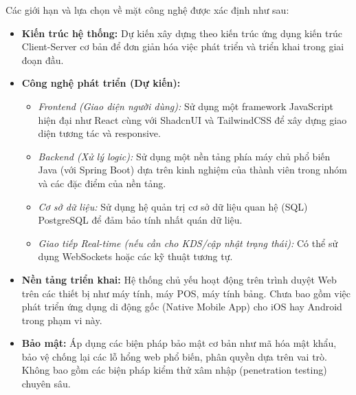 Các giới hạn và lựa chọn về mặt công nghệ được xác định như sau:

\begin{itemize}
    \item \textbf{Kiến trúc hệ thống:} Dự kiến xây dựng theo kiến trúc ứng dụng kiến trúc Client-Server cơ bản để đơn giản hóa việc phát triển và triển khai trong giai đoạn đầu.
    \item \textbf{Công nghệ phát triển (Dự kiến):}
        \begin{itemize}
            \item \textit{Frontend (Giao diện người dùng):} Sử dụng một framework JavaScript hiện đại như React cùng với ShadcnUI và TailwindCSS để xây dựng giao diện tương tác và responsive.
            \item \textit{Backend (Xử lý logic):} Sử dụng một nền tảng phía máy chủ phổ biến Java (với Spring Boot) dựa trên kinh nghiệm của thành viên trong nhóm và các đặc điểm của nền tảng.
            \item \textit{Cơ sở dữ liệu:} Sử dụng hệ quản trị cơ sở dữ liệu quan hệ (SQL) PostgreSQL để đảm bảo tính nhất quán dữ liệu.
            \item \textit{Giao tiếp Real-time (nếu cần cho KDS/cập nhật trạng thái):} Có thể sử dụng WebSockets hoặc các kỹ thuật tương tự.
        \end{itemize}
    \item \textbf{Nền tảng triển khai:} Hệ thống chủ yếu hoạt động trên trình duyệt Web trên các thiết bị như máy tính, máy POS, máy tính bảng. Chưa bao gồm việc phát triển ứng dụng di động gốc (Native Mobile App) cho iOS hay Android trong phạm vi này.
    \item \textbf{Bảo mật:} Áp dụng các biện pháp bảo mật cơ bản như mã hóa mật khẩu, bảo vệ chống lại các lỗ hổng web phổ biến, phân quyền dựa trên vai trò. Không bao gồm các biện pháp kiểm thử xâm nhập (penetration testing) chuyên sâu.
\end{itemize}
